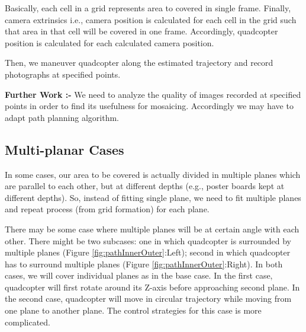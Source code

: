 \documentclass[11pt]{article}
\begin{document}
Basically, each cell in a grid represents area to covered in single frame.
Finally, camera extrinsics i.e., camera position is calculated for each cell in
the grid such that area in that cell will be covered in one frame. Accordingly,
quadcopter position is calculated for each calculated camera position.

Then, we maneuver quadcopter along the estimated trajectory and record
photographs at specified points.

\textbf{Further Work :-} We need to analyze the quality of images recorded at
specified points in order to find its usefulness for mosaicing. Accordingly we
may have to adapt path planning algorithm. 

\subsection{Multi-planar Cases}
In some cases, our area to be covered is actually divided in multiple planes
which are parallel to each other, but at different depths (e.g., poster boards
kept at different depths). So, instead of fitting single plane, we need to fit multiple
planes and repeat process (from grid formation) for each plane.

There may be some case where multiple planes will be at certain angle with each
other. There might be two subcases: one in which quadcopter is surrounded by
multiple planes (Figure \ref{fig:pathInnerOuter}:Left); second in which
quadcopter has to surround multiple planes (Figure \ref{fig:pathInnerOuter}:Right).
In both cases, we will cover individual planes as in the base case.  In the
first case, quadcopter will first rotate around its Z-axis before approaching
second plane. In the second case, quadcopter will move in circular trajectory
while moving from one plane to another plane. The control strategies for this
case is more complicated.
\end{document}
